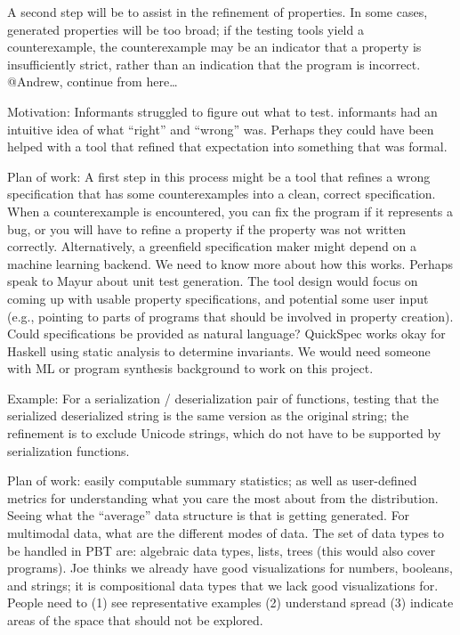 A second step will be to assist in the refinement of properties. In some cases, generated properties will be too broad; if the testing tools yield a counterexample, the counterexample may be an indicator that a property is insufficiently strict, rather than an indication that the program is incorrect. @Andrew, continue from here\ldots{}

Motivation: Informants struggled to figure out what to test. informants had an intuitive idea of what “right” and “wrong” was. Perhaps they could have been helped with a tool that refined that expectation into something that was formal.

Plan of work: A first step in this process might be a tool that refines a wrong specification that has some counterexamples into a clean, correct specification. When a counterexample is encountered, you can fix the program if it represents a bug, or you will have to refine a property if the property was not written correctly.
Alternatively, a greenfield specification maker might depend on a machine learning backend. We need to know more about how this works. Perhaps speak to Mayur about unit test generation. The tool design would focus on coming up with usable property specifications, and potential some user input (e.g., pointing to parts of programs that should be involved in property creation). Could specifications be provided as natural language? QuickSpec works okay for Haskell using static analysis to determine invariants. We would need someone with ML or program synthesis background to work on this project.

Example: For a serialization / deserialization pair of functions, testing that the serialized deserialized string is the same version as the original string; the refinement is to exclude Unicode strings, which do not have to be supported by serialization functions.




Plan of work: easily computable summary statistics; as well as user-defined metrics for understanding what you care the most about from the distribution. Seeing what the “average” data structure is that is getting generated. For multimodal data, what are the different modes of data. The set of data types to be handled in PBT are: algebraic data types, lists, trees (this would also cover programs). Joe thinks we already have good visualizations for numbers, booleans, and strings; it is compositional data types that we lack good visualizations for. People need to (1) see representative examples (2) understand spread (3) indicate areas of the space that should not be explored.

